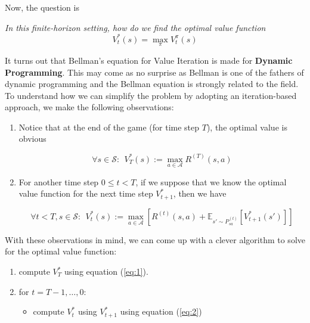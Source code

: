 \documentclass{article}
\begin{document}
Now, the question is

\begin{center}
	\textit{In this finite-horizon setting, how do we find the optimal value function}
	\[ V_t^*(s) = \max_\pi V_t^{\pi} (s)\]
	
\end{center}

It turns out that Bellman's equation for Value Iteration is made for \textbf{Dynamic Programming}. This may come as no surprise as Bellman is one of the fathers of dynamic programming and the Bellman equation is strongly related to the field. To understand how we can simplify the problem by adopting an iteration-based approach, we make the following observations:

\begin{enumerate}
	\item Notice that at the end of the game (for time step $ T $), the optimal value is obvious
	
	\begin{equation}
	\label{eq:1}
			\forall s \in \mathcal{S}: \ \ V_T^{*} (s) := \max_{a \in \mathcal{A}} R^{(T)}(s, a) 
	\end{equation}
	\item For another time step $ 0 \leq t < T $, if we suppose that we know the optimal value function for the next time step $ V_{t+1}^* $, then we have 
	
	\begin{equation}
	\label{eq:2}
			 \forall t < T, s \in \mathcal{S}: \ \ V_t^* (s):= \max_{a \in \mathcal{A}} \left[ R^{(t)}(s, a) + \mathbb{E}_{s' \sim P_{sa}^{(t)}}\left[ V_{t+1}^* (s')\right]  \right] 
	\end{equation}

\end{enumerate}

With these observations in mind, we can come up with a clever algorithm to solve for the optimal value function:

\begin{enumerate}
	\item compute $ V_T^* $ using equation (\ref{eq:1}).
	\item for $ t = T-1, \dots, 0 $:
		\begin{itemize}
			\item[]compute $ V_t^* $ using $ V_{t+1}^* $ using equation (\ref{eq:2})
		\end{itemize}
\end{enumerate}
\end{document}
